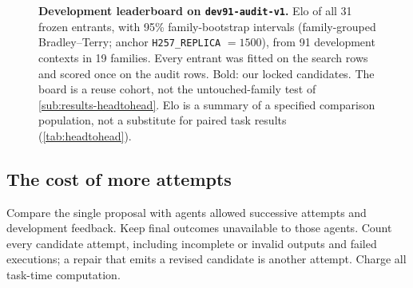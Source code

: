 \begin{table}[t]
  \centering
  \caption[Development reference: XSTACK\_2L against frozen comparators]{\textbf{Development reference: \texttt{XSTACK\_2L} against frozen
  comparators on \texttt{dev91-audit-v1}.} Gain is the family-equal mean of
  $u(\texttt{XSTACK\_2L})-u(\text{comparator})$, with
  $u=-\ln(\mathrm{RMSE}/\mathrm{RMSE}_{\text{mean}})$ against the search-row
  mean predictor, and its 95\% family-bootstrap interval (\num{10000} draws).
  RMSE is the implied cut $1-e^{-\text{gain}}$; positive values favour
  \texttt{XSTACK\_2L}. $p$ is the one-sided exact sign-flip test over the 19
  families on family means clipped at $\pm0.5$, and LOFO is the smallest
  leave-one-family-out clipped mean. ``Better'' means the test passes
  ($p<0.025$, LOFO $>0$); ``worse'' means its mirror passes. Wins, ties and
  losses count families. Every entrant was scored on all 91 contexts; none
  failed or was excluded. The rows are every frontier-designed regressor; the
  foundation models rated first and second and the best TabPFN; the two adjacent
  to \texttt{XSTACK\_2L}; and the best AutoML system and classic learner. All 30
  contrasts are in \texttt{figures/data/leaderboard\_dev91.json}. This is a reuse
  cohort, not a first-proposal result.}
  \label{tab:headtohead}
  \small\setlength{\tabcolsep}{4pt}
  
\end{table}

\begin{figure}[t]
  \centering
  
  \caption{\textbf{Development leaderboard on \texttt{dev91-audit-v1}.} Elo of
  all 31 frozen entrants, with 95\% family-bootstrap intervals (family-grouped
  Bradley--Terry; anchor \texttt{H257\_REPLICA} $=1500$), from 91 development
  contexts in 19 families. Every entrant was fitted on the search rows and
  scored once on the audit rows. Bold: our locked candidates. The board is a
  reuse cohort, not the untouched-family test of
  \cref{sub:results-headtohead}. Elo is a summary of a specified comparison
  population, not a substitute for paired task results (\cref{tab:headtohead}).}
  \label{fig:leaderboard}
\end{figure}

\subsection{The cost of more attempts}\label{sub:results-search}

Compare the single proposal with agents allowed successive attempts and
development feedback. Keep final outcomes unavailable to those agents.
Count every candidate attempt, including incomplete or invalid outputs
and failed executions; a repair that emits a revised candidate is another
attempt. Charge all task-time computation.

